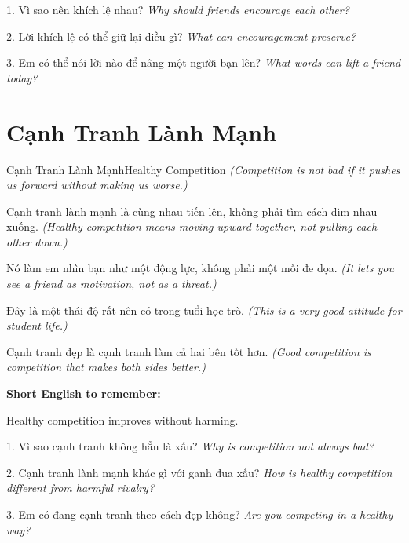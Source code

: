 \begin{tuhocnhanh}
1. Vì sao nên khích lệ nhau? \textit{Why should friends encourage each other?}

2. Lời khích lệ có thể giữ lại điều gì? \textit{What can encouragement preserve?}

3. Em có thể nói lời nào để nâng một người bạn lên? \textit{What words can lift a friend today?}
\end{tuhocnhanh}
\ngancach

\section{Cạnh Tranh Lành Mạnh}
\begin{truyen}{Cạnh Tranh Lành Mạnh}{Healthy Competition}
\textit{(Competition is not bad if it pushes us forward without making us worse.)}

Cạnh tranh lành mạnh là cùng nhau tiến lên, không phải tìm cách dìm nhau xuống.
\textit{(Healthy competition means moving upward together, not pulling each other down.)}

Nó làm em nhìn bạn như một động lực, không phải một mối đe dọa.
\textit{(It lets you see a friend as motivation, not as a threat.)}

Đây là một thái độ rất nên có trong tuổi học trò.
\textit{(This is a very good attitude for student life.)}
\end{truyen}

\begin{baihoc}
Cạnh tranh đẹp là cạnh tranh làm cả hai bên tốt hơn.
\textit{(Good competition is competition that makes both sides better.)}
\end{baihoc}

\begin{ghinhoanh}
\textbf{Short English to remember:}

Healthy competition improves without harming.

\end{ghinhoanh}

\begin{tuhocnhanh}
1. Vì sao cạnh tranh không hẳn là xấu? \textit{Why is competition not always bad?}

2. Cạnh tranh lành mạnh khác gì với ganh đua xấu? \textit{How is healthy competition different from harmful rivalry?}

3. Em có đang cạnh tranh theo cách đẹp không? \textit{Are you competing in a healthy way?}
\end{tuhocnhanh}
\ngancach

